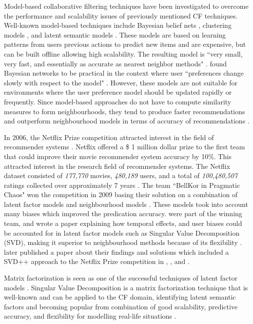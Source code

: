 Model-based collaborative filtering techniques have been investigated to overcome the performance and scalability issues of previously mentioned CF techniques. Well-known model-based techniques include Bayesian belief nets \cite{baysian}, clustering models \cite{clustering}, and latent semantic models \cite{latent}. These models are based on learning patterns from users previous actions to predict new items and are expensive, but can be built offline allowing high scalability. The resulting model is ``very small, very fast, and essentially as accurate as nearest neighbor methods" \cite{itembased}. \citeauthor{itembased} found Bayesian networks to be practical in the context where user ``preferences change slowly with respect to the model" \cite{itembased}. However, these models are not suitable for environments where the user preference model should be updated rapidly or frequently. Since model-based approaches do not have to compute similarity measures to form neighbourhoods, they tend to produce faster recommendations and outperform neighbourhood models in terms of accuracy of recommendations \cite{toward, itembased}. 

In 2006, the Netflix Prize competition attracted interest in the field of recommender systems \cite{survey}. Netflix offered a \$ 1 million dollar prize to the first team that could improve their movie recommender system accuracy by 10\%. This attracted interest in the research field of recommender systems. The Netflix dataset \cite{winnings} consisted of \textit{177,770} movies, \textit{480,189} users, and a total of \textit{100,480,507} ratings collected over approximately 7 years \cite{winnings}. The team ``BellKor in Pragmatic Chaos" won the competition in 2009 basing their solution on a combination of latent factor models and neighbourhood models \cite{winning, survey}. These models took into account many biases which improved the predication accuracy. \citeauthor{koren2009matrix} \cite{koren2009matrix} were part of the winning team, and wrote a paper explaining how temporal effects, and user biases could be accounted for in latent factor models such as Singular Value Decomposition (SVD), making it superior to neighbourhood methods because of its flexibility \cite{koren2009matrix}. \citeauthor{koren2011} later published a paper about their findings and solutions which included a SVD++ \cite{winnings, netflix_course} approach to the Netflix Prize competition in \cite{koren2011}, \cite{winnings}, and \cite{winners}.

Matrix factorization is seen as one of the successful techniques of latent factor models \cite{memorybased, koren2009matrix}. Singular Value Decomposition is a matrix factorization technique that is well-known and can be applied to the CF domain, identifying latent semantic factors and becoming popular from combination of good scalability, predictive accuracy, and flexibility for modelling real-life situations \cite{koren2009matrix}. 

